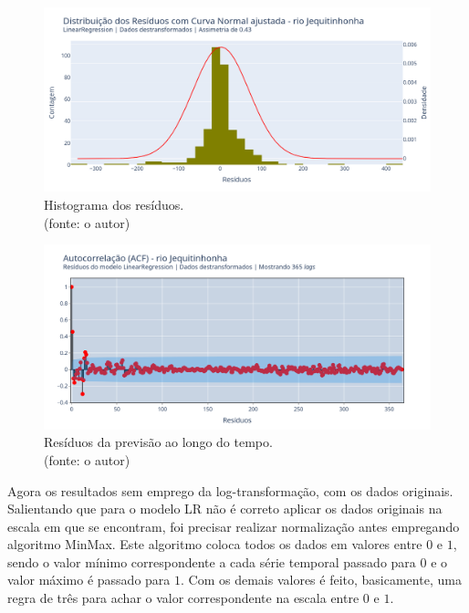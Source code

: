 \begin{figure}[!h]
	\centering
	\includegraphics[scale=0.33]{Figuras/jequiti/wfv/LR/LR_WFV_LOG_RESID_x_CURVA_NORMAL.png}
	\caption{Histograma dos resíduos.\\(fonte: o autor)}
	\label{fig:jequiti_LR_WFV_LOG_RESID_x_CURVA_NORMAL}
\end{figure}

\begin{figure}[!h]
	\centering
	\includegraphics[scale=0.33]{Figuras/jequiti/wfv/LR/LR_WFV_LOG_RESID_ACF.png}
	\caption{Resíduos da previsão ao longo do tempo.\\(fonte: o autor)}
	\label{fig:jequiti_LR_WFV_LOG_RESID_ACF}
\end{figure}
\clearpage

Agora os resultados sem emprego da log-transformação, com os dados originais. Salientando que para o modelo LR não é correto aplicar os dados originais na escala em que se encontram, foi precisar realizar normalização antes empregando algoritmo MinMax. Este algoritmo coloca todos os dados em valores entre $0$ e $1$, sendo o valor mínimo correspondente a cada série temporal passado para $0$ e o valor máximo é passado para $1$. Com os demais valores é feito, basicamente, uma regra de três para achar o valor correspondente na escala entre $0$ e $1$.

